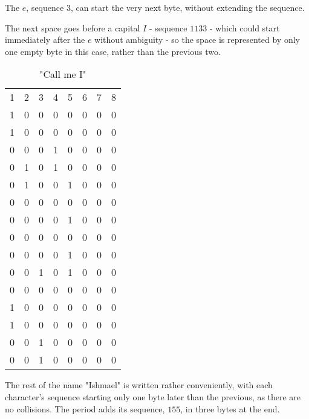 \documentclass{article}
\begin{document}
The $e$, sequence $3$, can start the very next byte, without extending the sequence.

The next space goes before a capital $I$ - sequence $1133$ - which could start immediately after the $e$ without ambiguity - so the space is represented by only one empty byte in this case, rather than the previous two.

\begin{table}
    \centering
    \begin{tabular}{cccccccc}
        1 & 2 & 3 & 4 & 5 & 6 & 7 & 8\\
        1 & 0 & 0 & 0 & 0 & 0 & 0 & 0\\
        1 & 0 & 0 & 0 & 0 & 0 & 0 & 0\\
        0 & 0 & 0 & 1 & 0 & 0 & 0 & 0\\
        0 & 1 & 0 & 1 & 0 & 0 & 0 & 0\\
        0 & 1 & 0 & 0 & 1 & 0 & 0 & 0\\
        0 & 0 & 0 & 0 & 0 & 0 & 0 & 0\\
        0 & 0 & 0 & 0 & 1 & 0 & 0 & 0\\
        0 & 0 & 0 & 0 & 0 & 0 & 0 & 0\\
        0 & 0 & 0 & 0 & 1 & 0 & 0 & 0\\
        0 & 0 & 1 & 0 & 1 & 0 & 0 & 0\\
        0 & 0 & 0 & 0 & 0 & 0 & 0 & 0\\
        1 & 0 & 0 & 0 & 0 & 0 & 0 & 0\\
        1 & 0 & 0 & 0 & 0 & 0 & 0 & 0\\
        0 & 0 & 1 & 0 & 0 & 0 & 0 & 0\\
        0 & 0 & 1 & 0 & 0 & 0 & 0 & 0\\
    \end{tabular}
    \caption{"Call me I"}
    \label{tab:my_label}
\end{table}

The rest of the name "Ishmael" is written rather conveniently, with each character's sequence starting only one byte later than the previous, as there are no collisions.  The period adds its sequence, $155$, in three bytes at the end.
\end{document}
